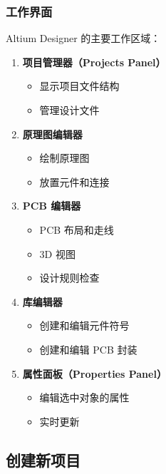 \subsubsection{工作界面}

Altium Designer 的主要工作区域：

\begin{enumerate}
  \item \textbf{项目管理器（Projects Panel）}
    \begin{itemize}
      \item 显示项目文件结构
      \item 管理设计文件
    \end{itemize}

  \item \textbf{原理图编辑器}
    \begin{itemize}
      \item 绘制原理图
      \item 放置元件和连接
    \end{itemize}

  \item \textbf{PCB 编辑器}
    \begin{itemize}
      \item PCB 布局和走线
      \item 3D 视图
      \item 设计规则检查
    \end{itemize}

  \item \textbf{库编辑器}
    \begin{itemize}
      \item 创建和编辑元件符号
      \item 创建和编辑 PCB 封装
    \end{itemize}

  \item \textbf{属性面板（Properties Panel）}
    \begin{itemize}
      \item 编辑选中对象的属性
      \item 实时更新
    \end{itemize}
\end{enumerate}

\subsection{创建新项目}


